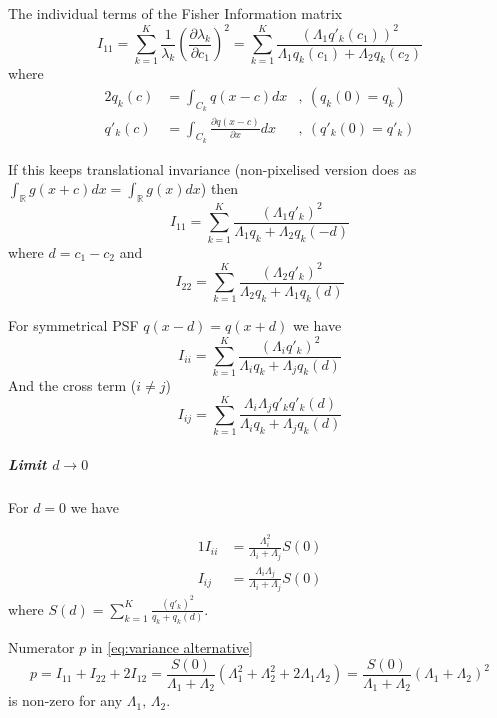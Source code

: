 The individual terms of the Fisher Information matrix 
%
\begin{equation}
	I_{11}=\sum_{k=1}^K\frac{1}{\lambda_k}\left(\frac{\partial\lambda_k}{\partial c_1}\right)^2=\sum_{k=1}^K\frac{\left(\Lambda_1q'_k(c_1)\right)^2}{\Lambda_1q_k(c_1)+\Lambda_2q_k(c_2)}
\end{equation}
%
where
%
\begin{alignat*}{2}
	q_k(c) & =\int_{C_k}q(x-c)dx & ,\ (q_k(0)=q_k)\\
	q'_k(c) & =\int_{C_k}\frac{\partial q(x-c)}{\partial x}dx & ,\ (q'_k(0)=q'_k)
\end{alignat*}

If this keeps translational invariance (non-pixelised version does as $\int_{\mathbb{R}}g(x+c)dx=\int_{\mathbb{R}}g(x)dx$) then 
%
\begin{equation}
	I_{11}=\sum_{k=1}^K\frac{\left(\Lambda_1q'_k\right)^2}{\Lambda_1q_k+\Lambda_2q_k(-d)}
\end{equation}
%
where $d=c_1-c_2$ and 
%
\begin{equation}
	I_{22}=\sum_{k=1}^K\frac{\left(\Lambda_2q'_k\right)^2}{\Lambda_2q_k+\Lambda_1q_k(d)}
\end{equation}

For symmetrical PSF $q(x-d)=q(x+d)$ we have 
%
\begin{equation}
	I_{ii}=\sum_{k=1}^K\frac{\left(\Lambda_iq'_k\right)^2}{\Lambda_iq_k+\Lambda_jq_k(d)}
	\label{eq:Fisher Information alternative - Individual}
\end{equation}
%
And the cross term ($i\neq j$) 
%
\begin{equation}
	I_{ij}=\sum_{k=1}^K\frac{\Lambda_i\Lambda_jq'_kq'_k(d)}{\Lambda_iq_k+\Lambda_jq_k(d)}
\end{equation}

\subparagraph{Limit $d\rightarrow0$}

For $d=0$ we have

\begin{alignat*}{1}
	I_{ii} & =\frac{\Lambda_i^2}{\Lambda_i+\Lambda_j}S(0)\\
	I_{ij} & =\frac{\Lambda_i\Lambda_j}{\Lambda_i+\Lambda_j}S(0)
\end{alignat*}
%
where $S(d)=\sum_{k=1}^K\frac{\left(q'_k\right)^2}{q_k+q_k(d)}$. 

Numerator $p$ in \autoref{eq:variance alternative} 
%
\begin{equation}
	p=I_{11}+I_{22}+2I_{12}=\frac{S(0)}{\Lambda_1+\Lambda_2}(\Lambda_1^2+\Lambda_2^2+2\Lambda_1\Lambda_2)=\frac{S(0)}{\Lambda_1+\Lambda_2}(\Lambda_1+\Lambda_2)^2
\end{equation}
%
is non-zero for any $\Lambda_1,\,\Lambda_2$.


